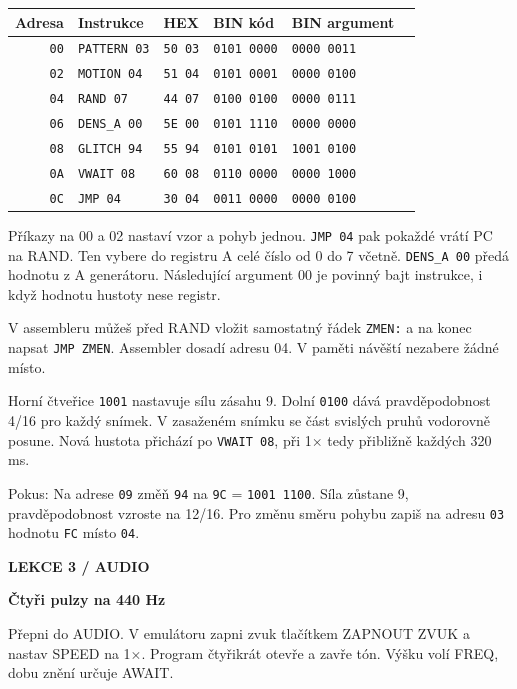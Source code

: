 \documentclass[11pt,a4paper]{article}
\newcommand{\tagline}[1]{{\sffamily\bfseries\color{accent}\small #1}\par}
\newcommand{\titleline}[1]{{\sffamily\bfseries\fontsize{25}{29}\selectfont #1\par}\vspace{2mm}}
\newcommand{\sub}[1]{\par\vspace{2mm}{\sffamily\bfseries\large #1\par}\nobreak}
\newcommand{\note}[1]{\par\vspace{2mm}\noindent\colorbox{pale}{\parbox{.96\linewidth}{\raggedright #1}}\par}
\begin{document}
{\small\begin{tabularx}{\linewidth}{@{}rllllX@{}}\toprule
\textbf{Adresa} & \textbf{Instrukce} & \textbf{HEX} & \textbf{BIN kód} & \textbf{BIN argument} & \textbf{}\\\midrule
\texttt{00} & \texttt{PATTERN 03} & \texttt{50 03} & \texttt{0101 0000} & \texttt{0000 0011} & \\
\texttt{02} & \texttt{MOTION 04} & \texttt{51 04} & \texttt{0101 0001} & \texttt{0000 0100} & \\
\texttt{04} & \texttt{RAND 07} & \texttt{44 07} & \texttt{0100 0100} & \texttt{0000 0111} & \\
\texttt{06} & \texttt{DENS\_A 00} & \texttt{5E 00} & \texttt{0101 1110} & \texttt{0000 0000} & \\
\texttt{08} & \texttt{GLITCH 94} & \texttt{55 94} & \texttt{0101 0101} & \texttt{1001 0100} & \\
\texttt{0A} & \texttt{VWAIT 08} & \texttt{60 08} & \texttt{0110 0000} & \texttt{0000 1000} & \\
\texttt{0C} & \texttt{JMP 04} & \texttt{30 04} & \texttt{0011 0000} & \texttt{0000 0100} & \\
\bottomrule\end{tabularx}}\par
\sub{Co se vrací a co trvá}
Příkazy na 00 a 02 nastaví vzor a pohyb jednou. \texttt{JMP 04} pak pokaždé vrátí PC na RAND. Ten vybere do registru A celé číslo od 0 do 7 včetně. \texttt{DENS\_A 00} předá hodnotu z A generátoru. Následující argument 00 je povinný bajt instrukce, i když hodnotu hustoty nese registr.

V assembleru můžeš před RAND vložit samostatný řádek \texttt{ZMEN:} a na konec napsat \texttt{JMP ZMEN}. Assembler dosadí adresu 04. V paměti návěští nezabere žádné místo.

\sub{Jak číst GLITCH 94}
Horní čtveřice \texttt{1001} nastavuje sílu zásahu 9. Dolní \texttt{0100} dává pravděpodobnost 4/16 pro každý snímek. V zasaženém snímku se část svislých pruhů vodorovně posune. Nová hustota přichází po \texttt{VWAIT 08}, při 1\ensuremath{\times} tedy přibližně každých 320 ms.

\note{Pokus: Na adrese \texttt{09} změň \texttt{94} na \texttt{9C} = \texttt{1001 1100}. Síla zůstane 9, pravděpodobnost vzroste na 12/16. Pro změnu směru pohybu zapiš na adresu \texttt{03} hodnotu \texttt{FC} místo \texttt{04}.}
\clearpage
\tagline{LEKCE 3  /  AUDIO}
\titleline{Čtyři pulzy na 440 Hz}
Přepni do AUDIO. V emulátoru zapni zvuk tlačítkem ZAPNOUT ZVUK a nastav SPEED na 1\ensuremath{\times}. Program čtyřikrát otevře a zavře tón. Výšku volí FREQ, dobu znění určuje AWAIT.
\end{document}
